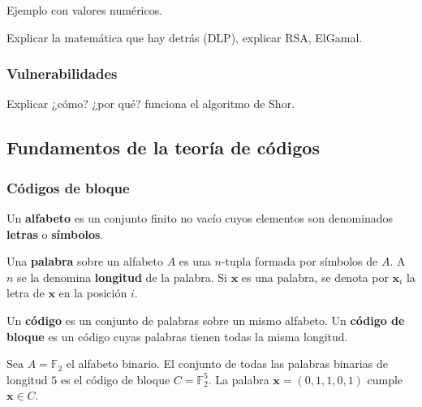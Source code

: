 \begin{example}
	Ejemplo con valores numéricos.
\end{example}

Explicar la matemática que hay detrás (DLP), explicar RSA, ElGamal.

\subsubsection{Vulnerabilidades}

Explicar ¿cómo? ¿por qué? funciona el algoritmo de Shor.

\subsection{Fundamentos de la teoría de códigos}

\subsubsection{Códigos de bloque}

\begin{definition}
	Un \textbf{alfabeto} es un conjunto finito no vacío cuyos elementos son denominados \textbf{letras} o \textbf{símbolos}.
\end{definition}

\begin{definition}
	Una \textbf{palabra} sobre un alfabeto $A$ es una $n$-tupla formada por símbolos de $A$. A $n$ se la denomina \textbf{longitud} de la palabra. Si $\textbf{x}$ es una palabra, se denota por $\textbf{x}_i$ la letra de $\textbf{x}$ en la posición $i$.
\end{definition}

\begin{definition}
	Un \textbf{código} es un conjunto de palabras sobre un mismo alfabeto. Un \textbf{código de bloque} es un código cuyas palabras tienen todas la misma longitud.
\end{definition}

\begin{example}
	Sea $A = \mathbb{F}_2$ el alfabeto binario. El conjunto de todas las palabras binarias de longitud $5$ es el código de bloque $C = \mathbb{F}_2^5$. La palabra $\textbf{x} = (0, 1, 1, 0, 1)$ cumple $\textbf{x} \in C$.
\end{example}

